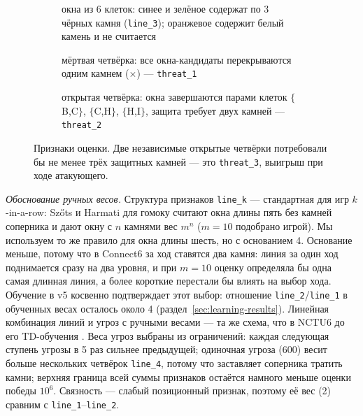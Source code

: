 \documentclass[a4paper,10pt,twocolumn]{article}
\newcommand{\code}[1]{\texttt{#1}}
\newcommand{\board}[4]{%
  \fill[board] (#1-0.6,-#3+0.6) rectangle (#2+0.6,-#4-0.6);
  \foreach \c in {#1,...,#2} {\draw[black!60,line width=0.3pt] (\c,-#3) -- (\c,-#4);
     \node[font=\tiny\ttfamily,above] at (\c,-#3+0.45) {\pgfmathparse{int(\c+64)}\char\pgfmathresult};}
  \foreach \r in {#3,...,#4} {\draw[black!60,line width=0.3pt] (#1,-\r) -- (#2,-\r);
     \node[font=\tiny\ttfamily,left] at (#1-0.45,-\r) {\pgfmathparse{int(\r+64)}\char\pgfmathresult};}
}
\newcommand{\B}[2]{\node[bstone] at (#1,-#2) {};}
\newcommand{\W}[2]{\node[wstone] at (#1,-#2) {};}
\begin{document}
\begin{figure}[t]
\centering
\begin{subfigure}[t]{0.36\textwidth}\centering
{}
\caption{окна из 6 клеток: синее и зелёное содержат по 3 чёрных камня (\code{line\_3}); оранжевое содержит белый камень и не считается}
\end{subfigure}\hfill
\begin{subfigure}[t]{0.28\textwidth}\centering
{}
\caption{мёртвая четвёрка: все окна-кандидаты перекрываются одним камнем ($\times$) --- \code{threat\_1}}
\end{subfigure}\hfill
\begin{subfigure}[t]{0.30\textwidth}\centering
{}
\caption{открытая четвёрка: окна завершаются парами клеток $\{$B,C$\}$, $\{$C,H$\}$, $\{$H,I$\}$, защита требует двух камней --- \code{threat\_2}}
\end{subfigure}
\caption{Признаки оценки. Две независимые открытые четвёрки потребовали бы не менее трёх защитных камней --- это \code{threat\_3}, выигрыш при ходе атакующего.}
\label{fig:features}
\end{figure}

\emph{Обоснование ручных весов.} Структура признаков \code{line\_k} --- стандартная для игр $k$-in-a-row: Szőts и Harmati \citeyearpar{szots2018gomoku} для гомоку считают окна длины пять без камней соперника и дают окну с $n$ камнями вес $m^n$ ($m=10$ подобрано игрой). Мы используем то же правило для окна длины шесть, но с основанием 4. Основание меньше, потому что в Connect6 за ход ставятся два камня: линия за один ход поднимается сразу на два уровня, и при $m=10$ оценку определяла бы одна самая длинная линия, а более короткие перестали бы влиять на выбор хода. Обучение в v5 косвенно подтверждает этот выбор: отношение \code{line\_2}/\code{line\_1} в обученных весах осталось около 4 (раздел~\ref{sec:learning-results}). Линейная комбинация линий и угроз с ручными весами --- та же схема, что в NCTU6 до его TD-обучения \citep{wu2012td}. Веса угроз выбраны из ограничений: каждая следующая ступень угрозы в 5 раз сильнее предыдущей; одиночная угроза (600) весит больше нескольких четвёрок \code{line\_4}, потому что заставляет соперника тратить камни; верхняя граница всей суммы признаков остаётся намного меньше оценки победы $10^6$. Связность --- слабый позиционный признак, поэтому её вес (2) сравним с \code{line\_1}--\code{line\_2}.
\end{document}
